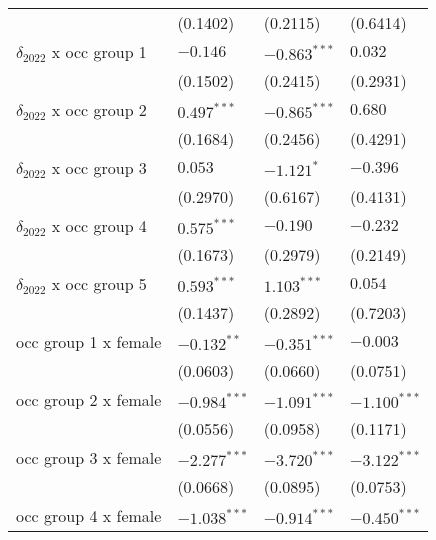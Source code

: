 \begin{tabular}{llll}
                                       &           (0.1402) &           (0.2115) &           (0.6414) \\
$\delta_{2022}$ x occ group 1          &           $-0.146$ &     $-0.863^{***}$ &            $0.032$ \\
                                       &           (0.1502) &           (0.2415) &           (0.2931) \\
$\delta_{2022}$ x occ group 2          &      $0.497^{***}$ &     $-0.865^{***}$ &            $0.680$ \\
                                       &           (0.1684) &           (0.2456) &           (0.4291) \\
$\delta_{2022}$ x occ group 3          &            $0.053$ &         $-1.121^*$ &           $-0.396$ \\
                                       &           (0.2970) &           (0.6167) &           (0.4131) \\
$\delta_{2022}$ x occ group 4          &      $0.575^{***}$ &           $-0.190$ &           $-0.232$ \\
                                       &           (0.1673) &           (0.2979) &           (0.2149) \\
$\delta_{2022}$ x occ group 5          &      $0.593^{***}$ &      $1.103^{***}$ &            $0.054$ \\
                                       &           (0.1437) &           (0.2892) &           (0.7203) \\
occ group 1 x female                   &      $-0.132^{**}$ &     $-0.351^{***}$ &           $-0.003$ \\
                                       &           (0.0603) &           (0.0660) &           (0.0751) \\
occ group 2 x female                   &     $-0.984^{***}$ &     $-1.091^{***}$ &     $-1.100^{***}$ \\
                                       &           (0.0556) &           (0.0958) &           (0.1171) \\
occ group 3 x female                   &     $-2.277^{***}$ &     $-3.720^{***}$ &     $-3.122^{***}$ \\
                                       &           (0.0668) &           (0.0895) &           (0.0753) \\
occ group 4 x female                   &     $-1.038^{***}$ &     $-0.914^{***}$ &     $-0.450^{***}$ \\

\end{tabular}
